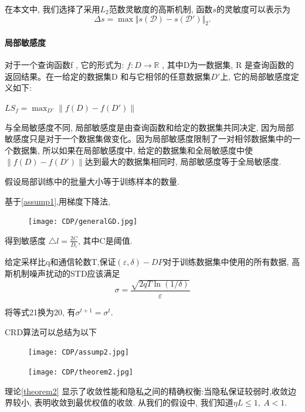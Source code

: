 在本文中, 我们选择了采用$L_2$范数灵敏度的高斯机制, 函数$s$的灵敏度可以表示为
\begin{equation}
\Delta s = \max\Vert s(\mathcal D)-s(\mathcal D')\Vert_{2}.
\end{equation}
 
\paragraph{局部敏感度} 对于一个查询函数f , 它的形式为: $f : D \to \mathbb{R}$ , 其中D为一数据集, R 是查询函数的返回结果。在一给定的数据集D 和与它相邻的任意数据集$D'$上, 它的局部敏感度定义如下:

$LS_f=\max_{D'} \|f(D)-f(D')\|$

与全局敏感度不同, 局部敏感度是由查询函数和给定的数据集共同决定, 因为局部敏感度只是对于一个数据集做变化。因为局部敏感度限制了一对相邻数据集中的一个数据集, 所以如果在局部敏感度中, 给定的数据集和全局敏感度中使$\|f(D)-f(D')\|$达到最大的数据集相同时, 局部敏感度等于全局敏感度. 


\begin{assumption}
    假设局部训练中的批量大小等于训练样本的数量. 
    \label{assump1}
\end{assumption}


基于\ref{assump1},用梯度下降法,
\begin{figure}[!ht]
    \centering
    \texttt{[image: CDP/generalGD.jpg]}
\end{figure}
得到敏感度
$ \triangle l = \frac{2C}{D_i}$, 其中C是阈值.


\begin{theorem}
    给定采样比q和通信轮数T,保证$(\varepsilon, \delta)-DP$对于训练数据集中使用的所有数据, 高斯机制噪声扰动的STD应该满足
$$\sigma= \frac{\sqrt{2qT\ln(1/\delta)} }{\varepsilon}$$
\end{theorem}

 将等式21换为20, 有$\sigma^{t+1}= \sigma^t$.

 CRD算法可以总结为以下
\begin{assumption}
    \begin{figure}[!ht]
        \centering
        \texttt{[image: CDP/assump2.jpg]}
    \end{figure}
\end{assumption}

\begin{theorem}
    \label{theorem2}
    \begin{figure}[!ht]
        \centering
        \texttt{[image: CDP/theorem2.jpg]}
    \end{figure}
\end{theorem}
理论\ref{theorem2} 显示了收敛性能和隐私之间的精确权衡:当隐私保证较弱时,收敛边界较小, 表明收敛到最优权值的收敛. 从我们的假设中, 我们知道$\eta L  \leqslant 1, \ A <1 $.


